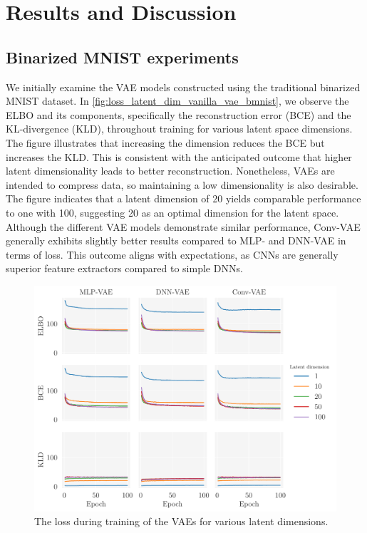 \newpage
\section{Results and Discussion}\label{sec:Results}

\subsection{Binarized MNIST experiments}

We initially examine the VAE models constructed using the traditional binarized MNIST dataset. In \autoref{fig:loss_latent_dim_vanilla_vae_bmnist}, we observe the ELBO and its components, specifically the reconstruction error (BCE) and the KL-divergence (KLD), throughout training for various latent space dimensions. The figure illustrates that increasing the dimension reduces the BCE but increases the KLD. This is consistent with the anticipated outcome that higher latent dimensionality leads to better reconstruction. Nonetheless, VAEs are intended to compress data, so maintaining a low dimensionality is also desirable. The figure indicates that a latent dimension of 20 yields comparable performance to one with 100, suggesting 20 as an optimal dimension for the latent space. Although the different VAE models demonstrate similar performance, Conv-VAE generally exhibits slightly better results compared to MLP- and DNN-VAE in terms of loss. This outcome aligns with expectations, as CNNs are generally superior feature extractors compared to simple DNNs.

\begin{figure}[!htb]
\begin{center}\includegraphics[scale=0.75]{latex/figures/loss_latent_dim_vanilla_mlp_dnn_vae_bmnist.pdf}
\end{center}
\caption{The loss during training of the VAEs for various latent dimensions.}
\label{fig:loss_latent_dim_vanilla_vae_bmnist}
\end{figure}


